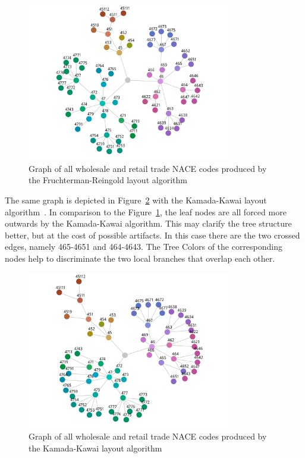 \documentclass[journal]{vgtc}                %
\begin{document}
\begin{figure}[tb]
  \centering
  \includegraphics[width=3.5in]{Gbusiness_FR.pdf}
  \caption{Graph of all wholesale and retail trade NACE codes produced by the Fruchterman-Reingold layout algorithm}\label{fig:graphFRApp}
\end{figure}

The same graph is depicted in Figure~\ref{fig:graphKKApp} with the Kamada-Kawai layout algorithm~\cite{Kamada89}. In comparison to the Figure~\ref{fig:graphFRApp}, the leaf nodes are all forced more outwards by the Kamada-Kawai algorithm. This may clarify the tree structure better, but at the cost of possible artifacts. In this case there are the two crossed edges, namely 465-4651 and 464-4643. The Tree Colors of the corresponding nodes help to discriminate the two local branches that overlap each other.



\begin{figure}[tb]
  \centering
  \includegraphics[width=3.5in]{Gbusiness_KK.pdf}
  \caption{Graph of all wholesale and retail trade NACE codes produced by the Kamada-Kawai layout algorithm}\label{fig:graphKKApp}
\end{figure}
\end{document}
